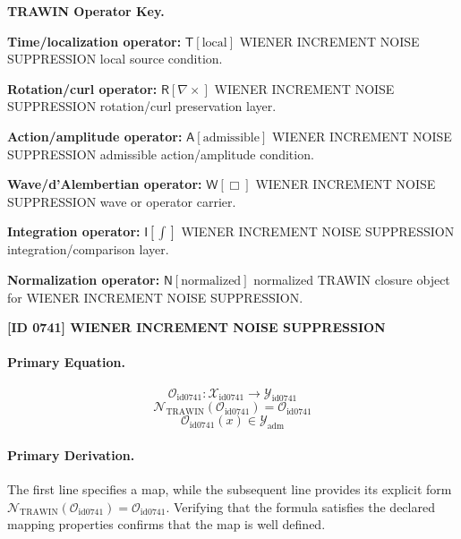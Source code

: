 \par\vspace{0.45\baselineskip}
\noindent\begin{minipage}[t]{\linewidth}
\begingroup
\small
\raggedright
\textbf{TRAWIN Operator Key.}\par
\noindent\textbf{Time/localization operator:} $\mathsf{T}\!\left[\mathrm{local}\right]$ WIENER INCREMENT NOISE SUPPRESSION local source condition.\par
\noindent\textbf{Rotation/curl operator:} $\mathsf{R}\!\left[\nabla\times\right]$ WIENER INCREMENT NOISE SUPPRESSION rotation/curl preservation layer.\par
\noindent\textbf{Action/amplitude operator:} $\mathsf{A}\!\left[\mathrm{admissible}\right]$ WIENER INCREMENT NOISE SUPPRESSION admissible action/amplitude condition.\par
\noindent\textbf{Wave/d'Alembertian operator:} $\mathsf{W}\!\left[\Box\right]$ WIENER INCREMENT NOISE SUPPRESSION wave or operator carrier.\par
\noindent\textbf{Integration operator:} $\mathsf{I}\!\left[\int\right]$ WIENER INCREMENT NOISE SUPPRESSION integration/comparison layer.\par
\noindent\textbf{Normalization operator:} $\mathsf{N}\!\left[\mathrm{normalized}\right]$ normalized TRAWIN closure object for WIENER INCREMENT NOISE SUPPRESSION.\par
\endgroup
\end{minipage}

\clearpage
\noindent\textbf{[ID 0741] WIENER INCREMENT NOISE SUPPRESSION}\par
\vspace{0.35em}
\paragraph{Primary Equation.}
\[
\mathcal{O}_{\mathrm{id0741}}:\mathcal{X}_{\mathrm{id0741}}\longrightarrow\mathcal{Y}_{\mathrm{id0741}}
\]
\[
\mathcal{N}_{\mathrm{TRAWIN}}(\mathcal{O}_{\mathrm{id0741}})=\mathcal{O}_{\mathrm{id0741}}
\]
\[
\mathcal{O}_{\mathrm{id0741}}(x)\in\mathcal{Y}_{\mathrm{adm}}
\]

\paragraph{Primary Derivation.}
The first line specifies a map, while the subsequent line provides its explicit form \( \mathcal{N}_{\mathrm{TRAWIN}}(\mathcal{O}_{\mathrm{id0741}})=\mathcal{O}_{\mathrm{id0741}} \). Verifying that the formula satisfies the declared mapping properties confirms that the map is well defined.
